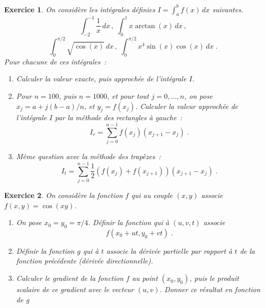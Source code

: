 \documentclass{article}
\newtheorem{exo}{Exercice}[section]
\begin{document}
\begin{giacjshere}
\begin{exo}{\rm
On consid\`ere les int\'egrales d\'efinies $I=\int_a^b f(x)\,dx$
suivantes.
$$
\int_{-2}^{-1}\frac{1}{x}\,dx\,,\;
\int_0^1 x\arctan(x)\,dx\,,
$$
$$
\int_0^{\pi/2} \sqrt{\cos(x)}\,dx\,,\;
\int_0^{\pi/2} x^4\sin(x)\cos(x)\,dx\;.
$$ 
Pour chacune de ces int\'egrales~:
\begin{enumerate}
\item
Calculer la valeur exacte, puis approch\'ee de l'int\'egrale $I$.
\item
Pour $n=100$, puis $n=1000$, et 
pour tout $j=0,\ldots,n$, on pose $x_j=a+j(b-a)/n$, et $y_j=f(x_j)$.
Calculer la valeur approch\'ee de l'int\'egrale $I$ par la 
m\'ethode des rectangles \`a gauche~:
$$
I_r = \sum_{j=0}^{n-1} f(x_j)(x_{j+1}-x_j)\;.
$$
\item
M\^eme question avec la m\'ethode des trap\`ezes~:
$$
I_t = \sum_{j=0}^{n-1} \frac{1}{2}(f(x_j)+f(x_{j+1}))(x_{j+1}-x_j)\;.
$$
\end{enumerate}
}\end{exo}
\begin{exo}{\rm
On consid\`ere la fonction $f$ qui au couple $(x,y)$ associe
$f(x,y)=\cos(xy)$.
\begin{enumerate}
\item
On pose $x_0=y_0=\pi/4$. D\'efinir la fonction qui \`a $(u,v,t)$
associe 
$$f(x_0+ut,y_0+vt)\;.$$ 
\item
D\'efinir la fonction $g$ qui \`a $t$ associe la d\'eriv\'ee partielle par
rapport \`a $t$ de la fonction pr\'ec\'edente (d\'eriv\'ee
directionnelle).
\item
Calculer le gradient de la fonction $f$ au point $(x_0,y_0)$, puis le
produit scalaire de ce gradient avec le vecteur $(u,v)$. 
Donner ce r\'esultat en fonction de g
\end{enumerate}
}\end{exo}


\end{giacjshere}
\end{document}
